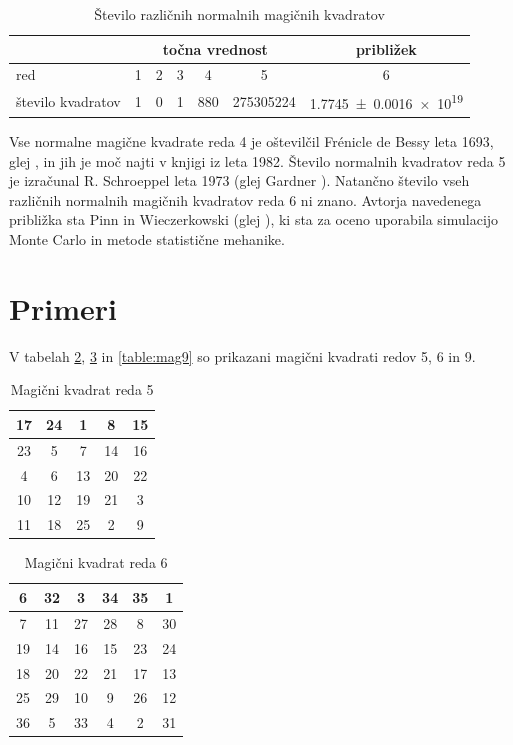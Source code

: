 \documentclass[a4paper,12pt]{article}
\theoremstyle{definition}
\theoremstyle{plain}
\newenvironment{magic}[3]{\begin{table}[!ht]
   \centering
   \caption{#2}
   \label{#3}
   \large
   \begin{tabular}{|*{#1}{c|}}
   \hline}{\end{tabular}
   \normalsize
\end{table}}
\begin{document}
\begin{table}[!ht]
   \centering
   \caption{Število različnih normalnih magičnih kvadratov}
   \label{table:stevila}
   \begin{tabular}{lcccccc}\toprule
      & \multicolumn{5}{c}{točna vrednost} & približek \\
      \midrule
      red & 1 & 2 & 3 & 4 & 5 & 6 \\
      število kvadratov & 1 & 0 & 1 & 880 & \num{275305224} & \num[separate-uncertainty]{1.7745 \pm 0.0016 e19} \\
      \bottomrule
   \end{tabular}
\end{table}

Vse normalne magične kvadrate reda 4 je oštevilčil Frénicle de Bessy
leta 1693, glej \cite{bessy}, in jih je moč najti v knjigi \cite{berlekamp}
iz leta 1982. Število normalnih kvadratov reda 5 je izračunal
R. Schroeppel leta 1973 (glej Gardner \cite{gardner}).
Natančno število vseh različnih normalnih magičnih kvadratov reda 6 ni znano.
Avtorja navedenega približka sta Pinn in Wieczerkowski (glej \cite{pinn}), ki
sta za oceno uporabila simulacijo Monte Carlo in metode statistične mehanike.


\section{Primeri}

V tabelah \ref{table:mag5}, \ref{table:mag6} in \ref{table:mag9} so prikazani
magični kvadrati redov 5, 6 in 9. %

\begin{magic}{5}{Magični kvadrat reda 5}{table:mag5}
17 & 24 &  1 &  8 & 15 \\\hline
23 &  5 &  7 & 14 & 16 \\\hline
4 &  6 & 13 & 20 & 22 \\\hline
10 & 12 & 19 & 21 &  3 \\\hline
11 & 18 & 25 &  2 &  9 \\\hline
\end{magic}

\begin{magic}{6}{Magični kvadrat reda 6}{table:mag6}
 6 & 32 &  3 & 34 & 35 &  1 \\\hline
 7 & 11 & 27 & 28 &  8 & 30 \\\hline
19 & 14 & 16 & 15 & 23 & 24 \\\hline
18 & 20 & 22 & 21 & 17 & 13 \\\hline
25 & 29 & 10 &  9 & 26 & 12 \\\hline
36 &  5 & 33 &  4 &  2 & 31 \\\hline
\end{magic}
\end{document}
